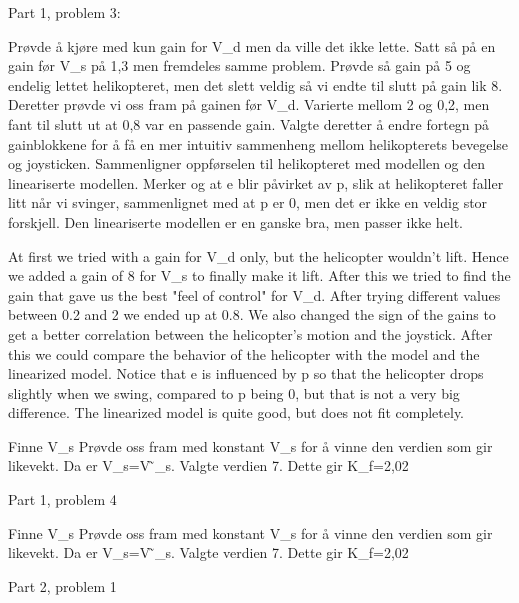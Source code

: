 Part 1, problem 3:

Prøvde å kjøre med kun gain for V_d men da ville det ikke lette. Satt så på en gain før V_s på 1,3 men fremdeles samme problem. Prøvde så gain på 5 og endelig lettet helikopteret, men det slett veldig så vi endte til slutt på gain lik 8. 
Deretter prøvde vi oss fram på gainen før V_d. Varierte mellom 2 og 0,2, men fant til slutt ut at 0,8 var en passende gain. Valgte deretter å endre fortegn på gainblokkene for å få en mer intuitiv sammenheng mellom helikopterets bevegelse og joysticken.
Sammenligner oppførselen til helikopteret med modellen og den lineariserte modellen.  Merker og at e blir påvirket av p, slik at helikopteret faller litt når vi svinger, sammenlignet med at p er 0, men det er ikke en veldig stor forskjell. Den lineariserte modellen er en ganske bra, men passer ikke helt.

At first we tried with a gain for V_d only, but the helicopter wouldn't lift. Hence we added a gain of 8 for V_s to finally make it lift. After this we tried to find the gain that gave us the best "feel of control" for V_d. After trying different values between 0.2 and 2 we ended up at 0.8. We also changed the sign of the gains to get a better correlation between the helicopter's motion and the joystick.  
After this we could compare the behavior of the helicopter with the model and the linearized model. Notice that e is influenced by p so that the helicopter drops slightly when we swing, compared to p being 0, but that is not a very big difference. The linearized model is quite good, but does not fit completely. 


Finne V_s 
Prøvde oss fram med konstant V_s for å vinne den verdien som gir likevekt. Da er V_s=V ̃_s. Valgte verdien 7. Dette gir K_f=2,02

Part 1, problem 4

Finne V_s 
Prøvde oss fram med konstant V_s for å vinne den verdien som gir likevekt. Da er V_s=V ̃_s. Valgte verdien 7. Dette gir K_f=2,02

Part 2, problem 1

